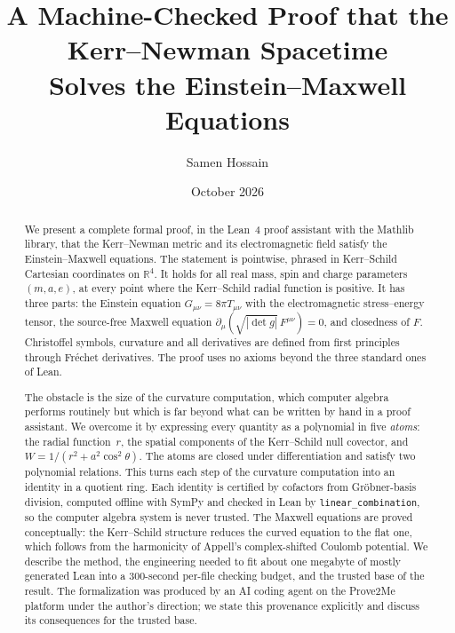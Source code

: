 \documentclass[11pt]{article}
\title{A Machine-Checked Proof that the Kerr--Newman Spacetime\\ Solves the Einstein--Maxwell Equations}
\author{Samen Hossain}
\date{October 2026}
\theoremstyle{definition}
\theoremstyle{remark}
\newcommand{\R}{\mathbb{R}}
\newcommand{\lean}[1]{\lstinline[basicstyle=\ttfamily\normalsize,columns=fullflexible,breaklines=false]{#1}}
\begin{document}
\maketitle

\begin{abstract}
We present a complete formal proof, in the Lean~4 proof assistant with the Mathlib library, that the Kerr--Newman metric and its electromagnetic field satisfy the Einstein--Maxwell equations.
The statement is pointwise, phrased in Kerr--Schild Cartesian coordinates on $\R^4$.
It holds for all real mass, spin and charge parameters $(m,a,e)$, at every point where the Kerr--Schild radial function is positive.
It has three parts: the Einstein equation $G_{\mu\nu}=8\pi T_{\mu\nu}$ with the electromagnetic stress--energy tensor, the source-free Maxwell equation $\partial_\mu(\sqrt{|\det g|}\,F^{\mu\nu})=0$, and closedness of $F$.
Christoffel symbols, curvature and all derivatives are defined from first principles through Fr\'echet derivatives.
The proof uses no axioms beyond the three standard ones of Lean.

The obstacle is the size of the curvature computation, which computer algebra performs routinely but which is far beyond what can be written by hand in a proof assistant.
We overcome it by expressing every quantity as a polynomial in five \emph{atoms}: the radial function~$r$, the spatial components of the Kerr--Schild null covector, and $W=1/(r^2+a^2\cos^2\theta)$.
The atoms are closed under differentiation and satisfy two polynomial relations.
This turns each step of the curvature computation into an identity in a quotient ring.
Each identity is certified by cofactors from Gr\"obner-basis division, computed offline with SymPy and checked in Lean by \lean{linear_combination}, so the computer algebra system is never trusted.
The Maxwell equations are proved conceptually: the Kerr--Schild structure reduces the curved equation to the flat one, which follows from the harmonicity of Appell's complex-shifted Coulomb potential.
We describe the method, the engineering needed to fit about one megabyte of mostly generated Lean into a 300-second per-file checking budget, and the trusted base of the result.
The formalization was produced by an AI coding agent on the Prove2Me platform under the author's direction; we state this provenance explicitly and discuss its consequences for the trusted base.
\end{abstract}

\tableofcontents

\end{document}
